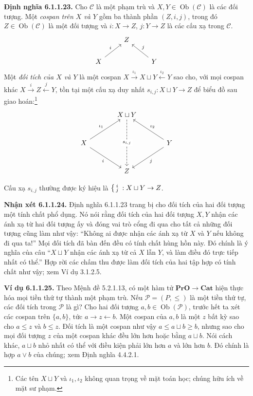 \noindent\textbf{Định nghĩa 6.1.1.23.} Cho $\mathcal C$ là một phạm trù và $X,Y\in\operatorname{Ob}(\mathcal C)$ là các đối tượng. Một \emph{cospan trên $X$ và $Y$} gồm ba thành phần $(Z,i,j)$, trong đó $Z\in\operatorname{Ob}(\mathcal C)$ là một đối tượng và $i:X\to Z$, $j:Y\to Z$ là các cấu xạ trong $\mathcal C$.
\[\begin{tikzcd}&Z&\\X\arrow[ur,"i"]&&Y\arrow[ul,"j"']\end{tikzcd}\]
Một \emph{đối tích của $X$ và $Y$} là một cospan $X\xrightarrow{\iota_1}X\sqcup Y\xleftarrow{\iota_2}Y$ sao cho, với mọi cospan khác $X\xrightarrow iZ\xleftarrow jY$, tồn tại một cấu xạ duy nhất $s_{i,j}:X\sqcup Y\to Z$ để biểu đồ sau giao hoán:\footnote{Các tên $X\sqcup Y$ và $\iota_1,\iota_2$ không quan trọng về mặt toán học; chúng hữu ích về mặt sư phạm.}
\[\begin{tikzcd}[column sep=large,row sep=large]&X\sqcup Y\arrow[dd,dashed,"s_{i,j}" description]&\\X\arrow[ur,"\iota_1"]\arrow[dr,"i"']&&Y\arrow[ul,"\iota_2"']\arrow[dl,"j"]\\&Z&\end{tikzcd}\]

Cấu xạ $s_{i,j}$ thường được ký hiệu là $\left\{\begin{smallmatrix}i\\j\end{smallmatrix}\right.:X\sqcup Y\to Z$.

\noindent\textbf{Nhận xét 6.1.1.24.} Định nghĩa 6.1.1.23 trang bị cho đối tích của hai đối tượng một tính chất phổ dụng. Nó nói rằng đối tích của hai đối tượng $X,Y$ nhận các ánh xạ từ hai đối tượng ấy và đóng vai trò cổng đi qua cho tất cả những đối tượng cũng làm như vậy: ``Không ai được nhận các ánh xạ từ $X$ và $Y$ nếu không đi qua ta!'' Mọi đối tích đã bàn đến đều có tính chất hùng hồn này. Đó chính là ý nghĩa của câu ``$X\sqcup Y$ nhận các ánh xạ từ cả $X$ lẫn $Y$, và làm điều đó trực tiếp nhất có thể.'' Hợp rời các chấm thu được làm đối tích của hai tập hợp có tính chất như vậy; xem Ví dụ 3.1.2.5.

\noindent\textbf{Ví dụ 6.1.1.25.} Theo Mệnh đề 5.2.1.13, có một hàm tử $\mathbf{PrO}\to\mathbf{Cat}$ hiện thực hóa mọi tiền thứ tự thành một phạm trù. Nếu $\mathcal P=(P,\le)$ là một tiền thứ tự, các đối tích trong $\mathcal P$ là gì? Cho hai đối tượng $a,b\in\operatorname{Ob}(\mathcal P)$, trước hết ta xét các cospan trên $\{a,b\}$, tức $a\to z\leftarrow b$. Một cospan của $a,b$ là một $z$ bất kỳ sao cho $a\le z$ và $b\le z$. Đối tích là một cospan như vậy $a\le a\sqcup b\ge b$, nhưng sao cho mọi đối tượng $z$ của một cospan khác đều lớn hơn hoặc bằng $a\sqcup b$. Nói cách khác, $a\sqcup b$ nhỏ nhất có thể với điều kiện phải lớn hơn $a$ và lớn hơn $b$. Đó chính là hợp $a\vee b$ của chúng; xem Định nghĩa 4.4.2.1.

